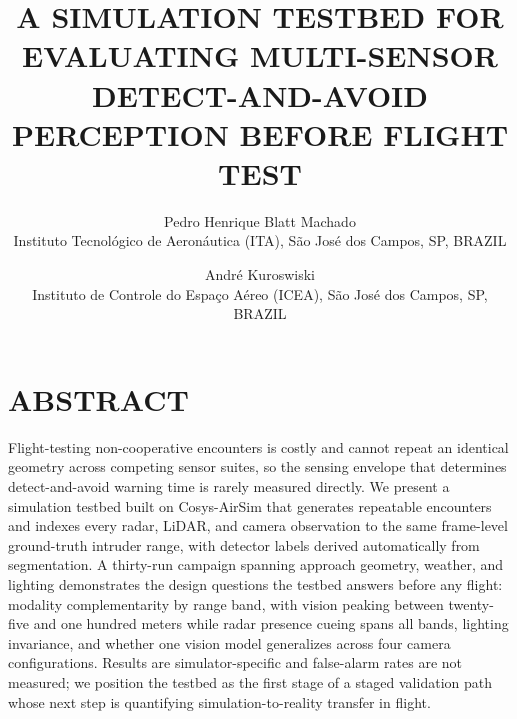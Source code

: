 \documentclass{wscposterproc}
\begin{document}

\title{A SIMULATION TESTBED FOR EVALUATING MULTI-SENSOR DETECT-AND-AVOID PERCEPTION BEFORE FLIGHT TEST}

\author{
Pedro Henrique Blatt Machado\\[2pt]
Instituto Tecnol\'ogico de Aeron\'autica (ITA), S\~ao Jos\'e dos Campos, SP, BRAZIL\\
\and
Andr\'e Kuroswiski\\[2pt]
Instituto de Controle do Espa\c{c}o A\'ereo (ICEA), S\~ao Jos\'e dos Campos, SP, BRAZIL\\
}

\maketitle

\section*{ABSTRACT}
Flight-testing non-cooperative encounters is costly and cannot repeat an identical geometry across competing sensor suites, so the sensing envelope that determines detect-and-avoid warning time is rarely measured directly.
We present a simulation testbed built on Cosys-AirSim that generates repeatable encounters and indexes every radar, LiDAR, and camera observation to the same frame-level ground-truth intruder range, with detector labels derived automatically from segmentation.
A thirty-run campaign spanning approach geometry, weather, and lighting demonstrates the design questions the testbed answers before any flight: modality complementarity by range band, with vision peaking between twenty-five and one hundred meters while radar presence cueing spans all bands, lighting invariance, and whether one vision model generalizes across four camera configurations.
Results are simulator-specific and false-alarm rates are not measured; we position the testbed as the first stage of a staged validation path whose next step is quantifying simulation-to-reality transfer in flight.
\end{document}
